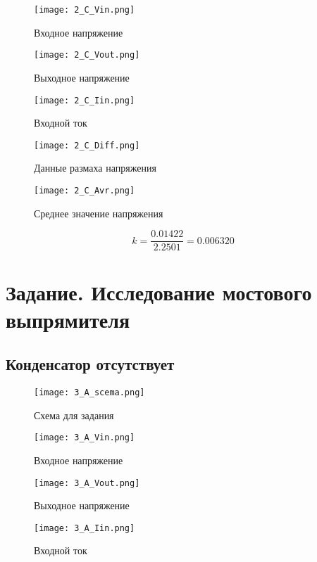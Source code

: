 \documentclass[a4paper,14pt]{article}
\begin{document}
\begin{figure}[H]
	\centering
	\texttt{[image: 2\_C\_Vin.png]}
	\caption{Входное напряжение}	
\end{figure}

\begin{figure}[H]
	\centering
	\texttt{[image: 2\_C\_Vout.png]}
	\caption{Выходное напряжение}	
\end{figure}

\begin{figure}[H]
	\centering
	\texttt{[image: 2\_C\_Iin.png]}
	\caption{Входной ток}	
\end{figure}

\begin{figure}[H]
	\centering
	\texttt{[image: 2\_C\_Diff.png]}
	\caption{Данные размаха напряжения}	
\end{figure}

\begin{figure}[H]
	\centering
	\texttt{[image: 2\_C\_Avr.png]}
	\caption{Среднее значение напряжения}	
\end{figure}

$$k = \frac{0.01422}{2.2501} = 0.006320$$

\section{Задание. Исследование мостового выпрямителя}

\subsection{Конденсатор отсутствует}
\begin{figure}[H]
	\centering
	\texttt{[image: 3\_A\_scema.png]}
	\caption{Схема для задания}	
\end{figure}

\begin{figure}[H]
	\centering
	\texttt{[image: 3\_A\_Vin.png]}
	\caption{Входное напряжение}	
\end{figure}

\begin{figure}[H]
	\centering
	\texttt{[image: 3\_A\_Vout.png]}
	\caption{Выходное напряжение}	
\end{figure}

\begin{figure}[H]
	\centering
	\texttt{[image: 3\_A\_Iin.png]}
	\caption{Входной ток}	
\end{figure}
\end{document}
